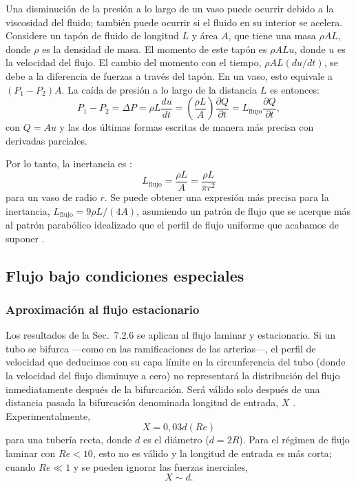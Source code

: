 \documentclass[12pt]{book}
\begin{document}
Una disminución de la presión a lo largo de un vaso puede ocurrir debido a la viscosidad del fluido; también puede ocurrir si el fluido en su interior se acelera. Considere un tapón de fluido de longitud $L$ y área $A$, que tiene una masa $\rho AL$, donde $\rho$ es la densidad de masa. El momento de este tapón es $\rho ALu$, donde $u$ es la velocidad del flujo. El cambio del momento con el tiempo, $\rho AL(du/dt)$, se debe a la diferencia de fuerzas a través del tapón. En un vaso, esto equivale a $(P_1 - P_2)A$. La caída de presión a lo largo de la distancia $L$ es entonces:
\begin{equation}
P_1 - P_2 = \Delta P = \rho L \frac{du}{dt} = \left( \frac{\rho L}{A} \right) \frac{\partial Q}{\partial t} = L_{\text{flujo}} \frac{\partial Q}{\partial t},
\label{eq:752}
\end{equation}
con $Q = Au$ y las dos últimas formas escritas de manera más precisa con derivadas parciales.

Por lo tanto, la inertancia es \cite{28}:
\begin{equation}
L_{\text{flujo}} = \frac{\rho L}{A} = \frac{\rho L}{\pi r^2}
\label{eq:753}
\end{equation}
para un vaso de radio $r$. Se puede obtener una expresión más precisa para la inertancia, $L_{\text{flujo}} = 9\rho L/(4A)$, asumiendo un patrón de flujo que se acerque más al patrón parabólico idealizado que el perfil de flujo uniforme que acabamos de suponer \cite{27,28}.

\subsection{Flujo bajo condiciones especiales}

\subsubsection*{Aproximación al flujo estacionario}

Los resultados de la Sec.~7.2.6 se aplican al flujo laminar y estacionario. Si un tubo se bifurca ---como en las ramificaciones de las arterias---, el perfil de velocidad que deducimos con su capa límite en la circunferencia del tubo (donde la velocidad del flujo disminuye a cero) no representará la distribución del flujo inmediatamente después de la bifurcación. Será válido solo después de una distancia pasada la bifurcación denominada longitud de entrada, $X$ \cite{4}. Experimentalmente,
\begin{equation}
X = 0{,}03 d (Re)
\label{eq:754}
\end{equation}
para una tubería recta, donde $d$ es el diámetro ($d = 2R$). Para el régimen de flujo laminar con $Re < 10$, esto no es válido y la longitud de entrada es más corta; cuando $Re \ll 1$ y se pueden ignorar las fuerzas inerciales,
\begin{equation}
X \sim d.
\label{eq:755}
\end{equation}
\end{document}
